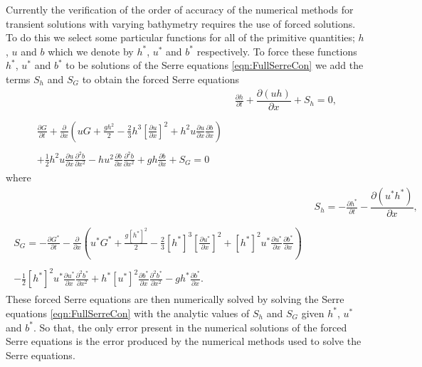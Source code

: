 Currently the verification of the order of accuracy of the numerical methods for transient solutions with varying bathymetry requires the use of forced solutions. To do this we select some particular functions for all of the primitive quantities; $h$, $u$ and $b$ which we denote by $h^*$, $u^*$ and $b^*$ respectively. To force these functions $h^*$, $u^*$ and $b^*$ to be solutions of the Serre equations \eqref{eqn:FullSerreCon} we add the terms $S_h$ and $S_G$ to obtain the forced Serre equations
\begin{subequations}
	\label{eqn:FullSerreConForced}
	\begin{align}
	& \frac{\partial h}{\partial t} + \dfrac{\partial (uh)}{\partial x} + S_{h}  = 0 ,\label{eqn:FullSerreConMassForced}  \\ \nonumber \\
	\begin{split}
	\label{eqn:SerreconsconmomForced}
	\frac{\partial G}{\partial t}  + \frac{\partial}{\partial x} \left( {u} G + \frac{gh^2}{2} - \frac{2}{3}h^3 \left[ \frac{\partial {u}}{\partial x} \right]^2 + h^2 {u}\frac{\partial {u}}{\partial x}\frac{\partial b}{\partial x} \right) \\ \\ + \frac{1}{2}h^2 {u} \frac{\partial {u}}{\partial x} \frac{\partial^2 b}{\partial x^2}  - h {u}^2\frac{\partial b}{\partial x}\frac{\partial^2 b}{\partial x^2} + gh\frac{\partial b}{\partial x} + S_{G} = 0
	\end{split}
	\end{align}
\end{subequations}  
where
\begin{align*}
&  S_{h} = -\frac{\partial h^*}{\partial t} - \dfrac{\partial (u^*h^*)}{\partial x} ,  \\ \nonumber \\
\begin{split}
S_{G} = -\frac{\partial G^*}{\partial t}  - \frac{\partial}{\partial x} \left( {u}^* G^* + \frac{g\left[h^*\right]^2}{2} - \frac{2}{3}\left[h^*\right]^3 \left[\frac{\partial {u}^*}{\partial x}\right]^2 + \left[h^*\right]^2 {u^*}\frac{\partial {u}^*}{\partial x}\frac{\partial b^*}{\partial x} \right) \\ \\ - \frac{1}{2}\left[h^*\right]^2 {u}^* \frac{\partial {u}^*}{\partial x} \frac{\partial^2 b^*}{\partial x^2}  + h^* {\left[u^*\right]}^2\frac{\partial b^*}{\partial x}\frac{\partial^2 b^*}{\partial x^2} - gh^*\frac{\partial b^*}{\partial x}.
\end{split}
\end{align*} 
These forced Serre equations are then numerically solved by solving the Serre equations \eqref{eqn:FullSerreCon} with the analytic values of $S_{h}$ and $S_{G}$ given $h^*$, $u^*$ and $b^*$. So that, the only error present in the numerical solutions of the forced Serre equations is the error produced by the numerical methods used to solve the Serre equations. 

